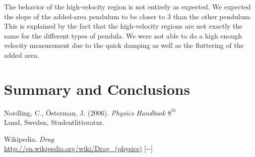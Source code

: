 \documentclass[11pt, a4paper]{article}
\newcommand{\todayswe}{\the\year-\twodigit\month-\twodigit\day}
\begin{document}
The behavior of the high-velocity region is not entirely as expected. We expected the slope of the added-area pendulum 
to be closer to $3$ than the other pendulum.
This is explained by the fact that the high-velocity regions are not exactly the same for the different types of pendula. We were not 
able to do a high enough velocity measurement due to the quick damping as well as the fluttering of the added area.
\section{Summary and Conclusions}
\vfill

\begin{thebibliography}{99}
	 Nordling, C., Österman, J. (2006). 
  \textit{Physics Handbook  $8^{th}$}\\
  Lund, Sweden, Studentlitteratur.

   Wikipedia. \textit{Drag}\\ 
  \url{http://en.wikipedia.org/wiki/Drag_(physics)} [\todayswe]

\end{thebibliography}

\begin{appendix}
\end{appendix}

\end{document}
